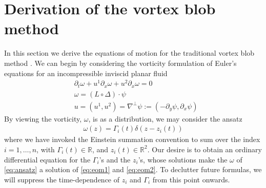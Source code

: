 \documentclass[12pt]{amsart}
\begin{document}
\section{Derivation of the vortex blob method}
\label{sec:vortex_blob}
In this section we derive the equations of motion for the traditional
vortex blob method .
We can begin by considering the vorticity formulation of Euler's equations for an incompressible inviscid planar fluid
\begin{align}
  &\partial_t \omega + u^1 \partial_x \omega + u^2 \partial_x \omega = 0 \label{eq:eom1} \\
  &\omega = (L \circ \Delta) \cdot \psi \label{eq:eom2} \\
  &u = (u^1,u^2) = \nabla^\perp \psi :=  (- \partial_y \psi, \partial_x \psi)
\end{align}
By viewing the vorticity, $\omega$, is as a distribution,
we may consider the ansatz
\begin{align}
  \omega(z) = \Gamma_i(t) \delta(z-z_i(t))
  \label{eq:ansatz}
\end{align} 
where we have invoked the Einstein summation convention to sum over 
the index $i=1,\dots,n$,
with $\Gamma_i(t) \in \mathbb{R}$,
and $z_i(t) \in \mathbb{R}^2$.
Our desire is to obtain an ordinary differential equation for the $\Gamma_i$'s and the $z_i$'s,
whose solutions make the $\omega$ of \eqref{eq:ansatz} a solution of \eqref{eq:eom1} and \eqref{eq:eom2}.
To declutter future formulas,
we will suppress the time-dependence of $z_i$ and $\Gamma_i$
from this point onwards.
\end{document}
